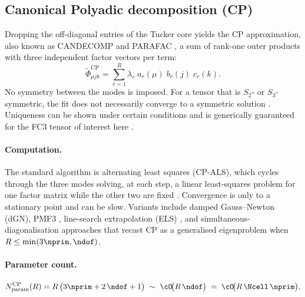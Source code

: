 \subsection{Canonical Polyadic decomposition (CP)}
\label{sub:fc3_cp}
Dropping the off-diagonal entries of the Tucker core yields the CP approximation, also
known as CANDECOMP and PARAFAC \cite{harshman_foundations_1970, hitchcock_expression_1927, carroll_analysis_1970}, a sum of
rank-one outer products with three independent factor vectors per term:
\begin{equation}\label{eq:fc3_cp_ansatz}
    \tilde\Phi_{\mu j k}^{\mathrm{CP}}
    = \sum_{r=1}^{R} \lambda_r\;a_r(\mu)\;b_r(j)\;c_r(k).
\end{equation}
No symmetry between the modes is imposed. For a tensor that is
$S_2$- or $S_3$-symmetric, the fit does not necessarily converge to a symmetric
solution \cite{ten_berge_typical_2004}. Uniqueness can be shown under certain conditions
\cite{kruskal_three-way_1977, sidiropoulos_uniqueness_2000} and is generically
guaranteed for the FC3 tensor of interest here
\cite{chiantini_generic_2012}.

\paragraph{Computation.} The standard algorithm is alternating least squares
(CP-ALS), which cycles through the three modes solving, at each step, a
linear least-squares problem for one factor matrix while the other two are
fixed \cite[Sec.~3.4]{kolda_tensor_2009}. Convergence is only to a
stationary point and can be slow. Variants include
damped Gauss--Newton (dGN), PMF3 \cite{paatero_weighted_1997},
line-search extrapolation (ELS) \cite{rajih_enhanced_2008}, and
simultaneous-diagonalisation approaches \cite{de_lathauwer_link_2006}
that recast CP as a generalised eigenproblem when
$R\le\min(3\nprim,\ndof)$.

\paragraph{Parameter count.}
\begin{equation}\label{eq:fc3_cp_params}
  N_{\mathrm{param}}^{\mathrm{CP}}(R)
  = R\,\bigl(3\nprim + 2\,\ndof + 1\bigr)
  \;\sim\; \cO\!\bigl(R\,\ndof\bigr)
  \;=\; \cO\!\bigl(R\,\Ncell\,\nprim\bigr).
\end{equation}

